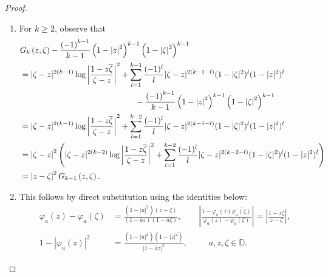 \documentclass[10pt,oneside,reqno]{amsart}
\theoremstyle{definition}
\theoremstyle{remark}
\newcommand{\abs}[1]{\left\lvert #1 \right\rvert}
\renewcommand{\ge}{\geqslant}
\newcommand{\D}{\mathbb D}
\numberwithin{equation}{section}
\begin{document}
\begin{proof}
    \begin{enumerate}
	\item For $k \ge 2$, observe that 
	    \begin{align*}
		& G_{k} \left( z, \zeta \right) - \frac{\left( -1 \right)^{k-1}}{k-1} \left( 1- \abs{z}^{2} \right)^{k-1} \left( 1- \abs{\zeta}^{2} \right)^{k-1} \\
&= |\zeta - z|^{2(k-1)} \log \left| \frac{1 - z\overline{\zeta}}{\zeta - z} \right|^2 + \sum_{l=1}^{k-1} \frac{(-1)^{l}}{l} |\zeta - z|^{2(k-1-l)}  (1 - |\zeta|^2)^{l} (1 - |z|^2)^{l}   \\ 
& \hspace{50mm} - \frac{\left( -1 \right)^{k-1}}{k-1} \left( 1- \abs{z}^{2} \right)^{k-1} \left( 1- \abs{\zeta}^{2} \right)^{k-1} \\
 &= |\zeta - z|^{2(k-1)} \log \left| \frac{1 - z\overline{\zeta}}{\zeta - z} \right|^2 + \sum_{l=1}^{k-2} \frac{(-1)^{l}}{l} |\zeta - z|^{2(k-1-l)}  (1 - |\zeta|^2)^{l} (1 - |z|^2)^{l}  \\
 &= \abs{\zeta - z}^{2} \left( |\zeta - z|^{2(k-2)} \log \left| \frac{1 - z\overline{\zeta}}{\zeta - z} \right|^2 + \sum_{l=1}^{k-2} \frac{(-1)^{l}}{l} |\zeta - z|^{2(k-2-l)}  (1 - |\zeta|^2)^{l} (1 - |z|^2)^{l}  \right) \\
 &= \abs{z-\zeta}^{2} G_{k-1} \left( z, \zeta \right).
	    \end{align*}
	\item This follows by direct substitution using the identities below:
	    \begin{align*}
		\varphi_{a} \left( z \right) - \varphi_{a} \left( \zeta \right) &= \frac{( 1-\abs{a}^{2} ) \left( z-\zeta \right)}{\left( 1-\overline{a}z \right) \left( 1-\overline{a}\zeta \right)},\qquad\abs{\frac{1-\varphi_{a} \left( z \right) \overline{\varphi_{a} \left( \zeta \right)}}{\varphi_{a} \left( z \right) - \varphi_{a} \left( \zeta \right)}} = \abs{\frac{1-z\overline{\zeta}}{z-\zeta}}, \\
		  1-\abs{\varphi_{a} \left( z \right)}^{2} &= \frac{\left( 1-\abs{a}^{2} \right) \left( 1-\abs{z}^{2} \right)}{\abs{1-\overline{a}z}^{2}},\,\,\,\qquad a,z,\zeta \in \D.
	    \end{align*}
	    

\end{enumerate}
\end{proof}
\end{document}
